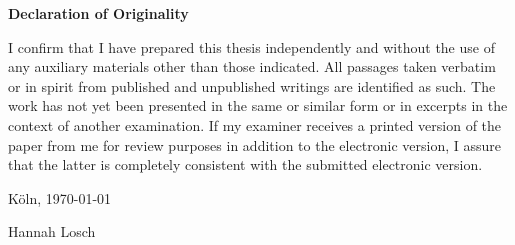 \Large
\textbf{Declaration of Originality}

\begin{normalsize}
I confirm that I have prepared this thesis independently and without the use of any auxiliary materials other than those indicated.
All passages taken verbatim or in spirit from published and unpublished writings are identified as such.
The work has not yet been presented in the same or similar form or in excerpts in the context of another examination.
If my examiner receives a printed version of the paper from me for review purposes in addition to the electronic version, I assure that the latter is completely consistent with the submitted electronic version.
 \newline \newline

Köln, \today \newline \newline

Hannah Losch
\end{normalsize}
